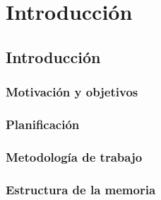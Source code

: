 \chapter{Introducción}\label{sec:intro}

\section{Introducción}
\subsection{Motivación y objetivos}
\subsection{Planificación}
\subsection{Metodología de trabajo}
\subsection{Estructura de la memoria}